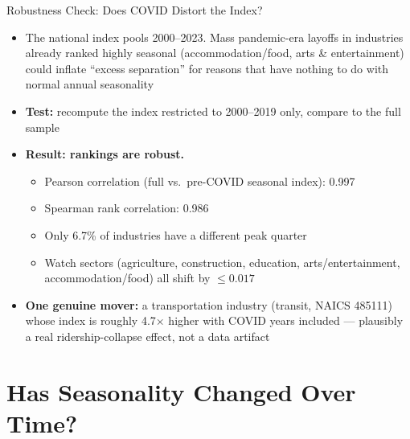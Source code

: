 \documentclass[aspectratio=169]{beamer}
\begin{document}
\begin{frame}{Robustness Check: Does COVID Distort the Index?}
  \begin{itemize}
    \item The national index pools 2000--2023. Mass pandemic-era layoffs in
          industries already ranked highly seasonal (accommodation/food,
          arts \& entertainment) could inflate ``excess separation'' for
          reasons that have nothing to do with normal annual seasonality
    \item \textbf{Test:} recompute the index restricted to 2000--2019 only,
          compare to the full sample
    \bigskip
    \item \textbf{Result: rankings are robust.}
    \begin{itemize}
      \item Pearson correlation (full vs.\ pre-COVID seasonal index): 0.997
      \item Spearman rank correlation: 0.986
      \item Only 6.7\% of industries have a different peak quarter
      \item Watch sectors (agriculture, construction, education, arts/entertainment,
            accommodation/food) all shift by $\leq 0.017$
    \end{itemize}
    \bigskip
    \item \textbf{One genuine mover:} a transportation industry (transit,
          NAICS 485111) whose index is roughly 4.7$\times$ higher with COVID years
          included --- plausibly a real ridership-collapse effect, not a data artifact
  \end{itemize}
\end{frame}

\section{Has Seasonality Changed Over Time?}
\end{document}
